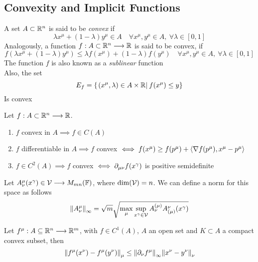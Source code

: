 \documentclass[../complete.tex]{subfiles}
\begin{document}
\subsection{Convexity and Implicit Functions}
\begin{dfn}
	A set $A\subset\mathbb{R}^n$ is said to be \textit{convex} if
	\begin{equation}
		\lambda x^\mu+(1-\lambda)y^\mu\in A\quad\forall x^\mu,y^\mu\in A,\ \forall\lambda\in[0,1]
		\label{eq:convexityset}
	\end{equation}
	Analogously, a function $f:A\subset\mathbb{R}^n\overset{}{\longrightarrow}\mathbb{R}$ is said to be convex, if
	\begin{equation}
		f\left( \lambda x^\mu+(1-\lambda)y^\mu \right)\le\lambda f(x^\mu)+(1-\lambda)f(y^\mu)\quad\forall x^\mu,y^\mu\in A,\ \forall\lambda\in[0,1]
		\label{eq:convexfx}
	\end{equation}
	The function $f$ is also known as a \textit{sublinear} function\\
	Also, the set
	\begin{equation}
		E_f=\{\left.(x^\mu,\lambda)\in A\times\mathbb{R}\right|_{}f(x^\mu)\le y\}
		\label{eq:convexset}
	\end{equation}
	Is convex
\end{dfn}
\begin{thm}[Convexity]
	Let $f:A\subset\mathbb{R}^n\overset{}{\longrightarrow}\mathbb{R}$.
	\begin{enumerate}
	\item $f$ convex in $A\implies f\in C(A)$
	\item $f$ differentiable in $A\implies f$ convex $\iff f(x^\mu)\ge f(p^\mu)+\langle \nabla f(p^\mu), x^\mu-p^\mu \rangle$
	\item $f\in C^2(A)\implies f$ convex $\iff \partial_{\mu\nu}f(x^\gamma)$ is positive semidefinite
	\end{enumerate}
\end{thm}
\begin{dfn}
	Let $A^\mu_\nu(x^\gamma)\in\mathcal{V}\overset{}{\longrightarrow} M_{mn}(\mathbb{F})$, where $\dim(\mathcal{V})=n$. We can define a norm for this space as follows
	\begin{equation}
		\norm{A^\mu_\nu}_\infty=\sqrt{m}\sqrt{\max_{\mu}\sup_{x^\gamma\in\mathcal{V}}A^{(\mu)}_\nu A^\nu_{(\mu)}(x^\gamma)}
		\label{eq:matrixinorm}
	\end{equation}
\end{dfn}
\begin{thm}
	Let $f^\mu:A\subseteq\mathbb{R}^n\overset{}{\longrightarrow}\mathbb{R}^m$, with $f\in C^1(A)$, $A$ an open set and $K\subset A$ a compact convex subset, then
	\begin{equation}
		\norm{f^\mu(x^\nu)-f^\mu(y^\nu)}_\mu\le\norm{\partial_\nu f^\mu}_\infty\norm{x^\nu-y^\nu}_\nu
		\label{eq:averageval}
	\end{equation}
\end{thm}
\end{document}

